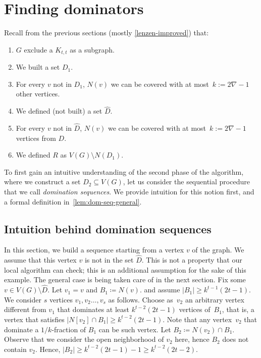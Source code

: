 
\section{Finding dominators}
Recall from the previous sections (mostly \cref{lenzen-improved}) that:
\begin{enumerate}
  \item $G$ exclude a $K_{t,t}$ as a subgraph.
  \item We built a set $D_1$.
  \item For every $v$ not in $D_1$, $N(v)$  we can
  be covered with at most~$k:=2\nabla-1$ other vertices.
  \item We defined (not built) a set $\hat D$.
  \item For every $v$ not in $\hat D$, $N(v)$  we can
  be covered with at most~$k:=2\nabla-1$ vertices from $D$.
  \item We defined $R$ as $V(G)\setminus N(D_1)$.
\end{enumerate}

To first gain an intuitive understanding of the second phase of the
algorithm, where we construct a set $D_2\subseteq V(G)$, let us consider the
sequential procedure that we call {\em domination sequences}. We provide
intuition for this notion first, and a formal definition
in~\cref{lem:dom-seq-general}.

\subsection{Intuition behind domination sequences}
In this section, we build a sequence starting from a vertex $v$ of the graph.
We assume that this vertex $v$ is not in the set $\hat D$. This is not a
property that our local algorithm can check; this is an additional assumption
for the sake of this example. The general case is being taken care of in the
next section.
%
Fix some $v\in V(G)\setminus \hat D$. Let $v_1=v$ and $B_1\coloneqq N(v)$.
and assume $|B_1|\geq k^{t-1}(2t{-}1)$. We consider $s$
vertices $v_1,v_2\ldots, v_s$ as follows.
Choose as~$v_2$ an arbitrary vertex different from $v_1$
that dominates at least $k^{t-2}(2t-1)$ vertices of~$B_1$, that is,
a vertex that satisfies $|N[v_2]\cap B_1|\geq k^{t-2}(2t-1)$.
Note that any vertex~$v_2$ that dominate a $1/k$-fraction of $B_1$ can
be such vertex.
%
Let $B_2\coloneqq N(v_2)\cap B_1$. Observe that we consider
the open neighborhood of $v_2$ here, hence $B_2$ does
not contain $v_2$. Hence, $|B_2|\geq k^{t-2}(2t-1)-1\geq
k^{t-2}(2t-2)$.

